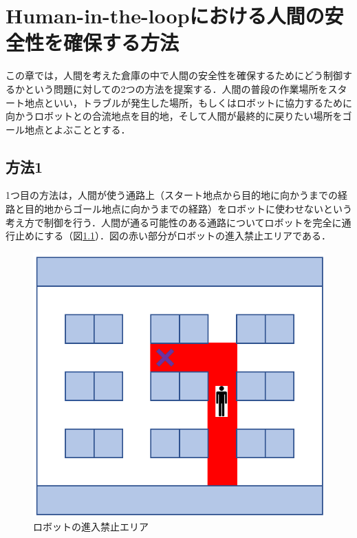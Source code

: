 

%

\chapter{Human-in-the-loopにおける人間の安全性を確保する方法}\label{chap:method}

この章では，人間を考えた倉庫の中で人間の安全性を確保するためにどう制御するかという問題に対しての2つの方法を提案する．人間の普段の作業場所をスタート地点といい，トラブルが発生した場所，もしくはロボットに協力するために向かうロボットとの合流地点を目的地，そして人間が最終的に戻りたい場所をゴール地点とよぶこととする．

\section{方法1}
1つ目の方法は，人間が使う通路上（スタート地点から目的地に向かうまでの経路と目的地からゴール地点に向かうまでの経路）をロボットに使わせないという考え方で制御を行う．人間が通る可能性のある通路についてロボットを完全に通行止めにする（図\ref{fig:area}）．図の赤い部分がロボットの進入禁止エリアである．

\begin{figure}[h]
    \centering
    \includegraphics[scale=0.3]{figures/4_area.png}
    \caption{ロボットの進入禁止エリア}
    \label{fig:area}
\end{figure}

